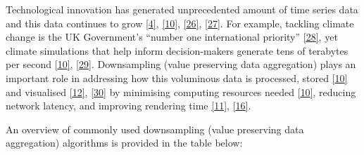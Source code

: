 \documentclass{article}
\begin{document}
Technological innovation has generated unprecedented amount of time
series data and this data continues to grow
\protect\hyperlink{ref-data2020}{{[}4{]}},
\protect\hyperlink{ref-TVStore}{{[}10{]}},
\protect\hyperlink{ref-storage}{{[}26{]}},
\protect\hyperlink{ref-CatchUp}{{[}27{]}}. For example, tackling climate
change is the UK Government's ``number one international priority''
\protect\hyperlink{ref-IR}{{[}28{]}}, yet climate simulations that help
inform decision-makers generate tens of terabytes per second
\protect\hyperlink{ref-TVStore}{{[}10{]}},
\protect\hyperlink{ref-climate}{{[}29{]}}. Downsampling (value
preserving data aggregation) plays an important role in addressing how
this voluminous data is processed, stored
\protect\hyperlink{ref-TVStore}{{[}10{]}} and visualised
\protect\hyperlink{ref-Sveinn}{{[}12{]}},
\protect\hyperlink{ref-dashql}{{[}30{]}} by minimising computing
resources needed \protect\hyperlink{ref-TVStore}{{[}10{]}}, reducing
network latency, and improving rendering time
\protect\hyperlink{ref-datapoint}{{[}11{]}},
\protect\hyperlink{ref-MinMaxLTTB}{{[}16{]}}.

An overview of commonly used downsampling (value preserving data
aggregation) algorithms is provided in the table below:
\end{document}
